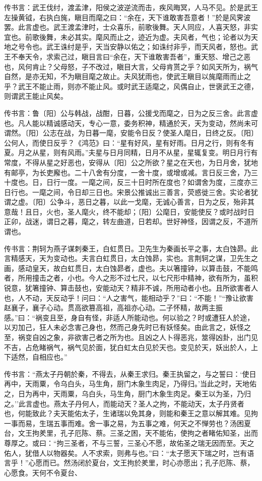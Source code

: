 \documentclass[]{article}
\begin{document}
传书言：武王伐纣，渡孟津，阳侯之波逆流而击，疾风晦冥，人马不见。於是武王左操黄钺，右执白旄，瞋目而麾之曰：``余在，天下谁敢害吾意者！''於是风霁波罢。此言虚也。武王渡孟津时，士众喜乐，前歌後舞。天人同应，人喜天怒，非实宜也。前歌後舞，未必其实。麾风而止之，迹近为虚。夫风者，气也；论者以为天地之号令也。武王诛纣是乎，天当安静以佑之；如诛纣非乎，而天风者，怒也。武王不奉天令，求索己过，瞋目言曰``余在，天下谁敢害吾者''，重天怒、增己之恶也，风何肯止？父母怒，子不改过，瞋目大言，父母肯贳之乎？如风天所为，祸气自然，是亦无知，不为瞋目麾之故止。夫风犹雨也，使武王瞋目以旄麾雨而止之乎？武王不能止雨，则亦不能止风。或时武王适麾之，风偶自止，世褒武王之德，则谓武王能止风矣。

传书言：鲁〔阳〕公与韩战，战酣，日暮，公援戈而麾之，日为之反三舍。此言虚也。凡人能以精诚感动天，专心一意，委务积神，精通於天，天为变动，然尚未可谓然。〔阳〕公志在战，为日暮一麾，安能令日反？使圣人麾日，日终之反。〔阳〕公何人，而使日反乎？《鸿范》曰：``星有好风，星有好雨。日月之行，则有冬有夏。月之从星，则有风雨。''夫星与日月同精，日月不从星，星辄复变。明日月行有常度，不得从星之好恶也，安得从〔阳〕公之所欲？星之在天也，为日月舍，犹地有邮亭，为长吏廨也。二十八舍有分度，一舍十度，或增或减。言日反三舍，乃三十度也。日，日行一度。一麾之间，反三十日时所在度也？如谓舍为度，三度亦三日行也。一麾之间，令日却三日也。宋景公推诚出三善言，荧惑徙三舍。实论者犹谓之虚。〔阳〕公争斗，恶日之暮，以此一戈麾，无诚心善言，日为之反，殆非其意哉！且日，火也，圣人麾火，终不能却；〔阳〕公麾日，安能使反？或时战时日正卯，战迷，谓日之暮，麾之，转左曲道，日若却。世好神怪，因谓之反，不道所谓也。

传书言：荆轲为燕子谋刺秦王，白虹贯日。卫先生为秦画长平之事，太白蚀昴。此言精感天，天为变动也。夫言白虹贯日，太白蚀昴，实也。言荆轲之谋，卫先生之画，感动皇天，故白虹贯日，太白蚀昴者，虚也。夫以箸撞钟，以算击鼓，不能鸣者，所用撞击之者，小也。今人之形不过七尺，以七尺形中精神，欲有所为，虽积锐意，犹箸撞钟、算击鼓也，安能动天？精非不诚，所用动者小也。且所欲害者人也，人不动，天反动乎！问曰：``人之害气，能相动乎？''曰：``不能！''``豫让欲害赵襄子，襄子心动。贯高欲篡高祖，高祖亦心动。二子怀精，故两主振感。''曰：``祸变且至，身自有怪，非适人所能动也。何以验之？时或遭狂人於途，以刃加己，狂人未必念害己身也，然而己身先时已有妖怪矣。由此言之，妖怪之至，祸变自凶之象，非欲害己者之所为也。且凶之人卜得恶兆，筮得凶卦，出门见不吉，占危睹祸气，祸气见於面，犹白虹太白见於天也。变见於天，妖出於人，上下适然，自相应也。''

传书言：``燕太子丹朝於秦，不得去，从秦王求归。秦王执留之，与之誓曰：`使日再中，天雨粟，令乌白头，马生角，厨门木象生肉足，乃得归。'当此之时，天地佑之，日为再中，天雨粟，乌白头，马生角，厨门木象生肉足。秦王以为圣，乃归之。''此言虚也。燕太子丹何人，而能动天？圣人之拘，不能动天，太子丹贤者也，何能致此？夫天能佑太子，生诸瑞以免其身，则能和秦王之意以解其难。见拘一事而易，生瑞五事而难。舍一事之易，为五事之难，何天之不惮劳也？汤困夏台，文王拘羑里，孔子厄陈、蔡。三圣之困，天不能佑，使拘之者睹佑知圣，出而尊厚之。或曰：``拘三圣者，不与三誓，三圣心不愿，故佑圣之瑞无因而至。天之佑人，犹借人以物器矣。人不求索，则弗与也。''曰：``太子愿天下瑞之时，岂有语言乎！''心愿而已。然汤闭於夏台，文王拘於羑里，时心亦愿出；孔子厄陈、蔡，心愿食。天何不令夏台、
\end{document}
